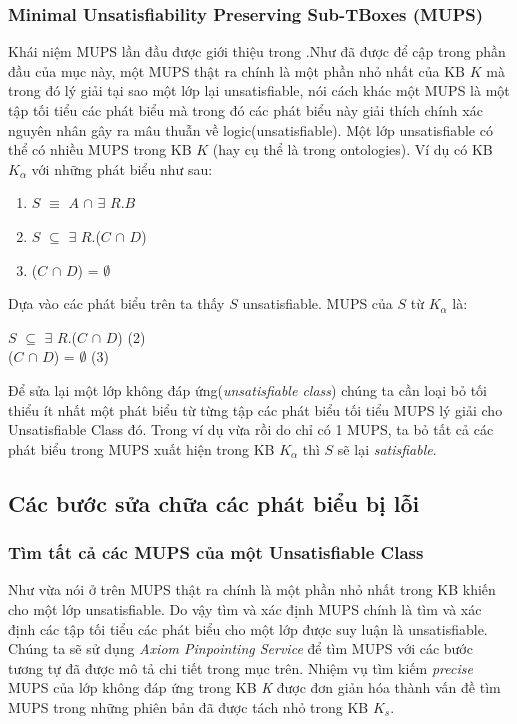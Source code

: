 \subsubsection{Minimal Unsatisfiability Preserving Sub-TBoxes (MUPS)}
Khái niệm MUPS lần đầu được giới thiệu trong \cite{mups}.Như đã được để cập trong phần đầu của mục này, một MUPS thật ra chính là một phần nhỏ nhất của KB $K$ mà trong đó lý giải tại sao một lớp lại unsatisfiable, nói cách khác một MUPS là một tập tối tiểu các phát biểu mà trong đó các phát biểu này giải thích chính xác nguyên nhân gây ra mâu thuẫn về logic(unsatisfiable). Một lớp unsatisfiable có thể có nhiều MUPS trong KB $K$ (hay cụ thể là trong ontologies). Ví dụ có KB $K_{\alpha}$ với những phát biểu như sau:
	\begin{enumerate}
		\item $S$ $\equiv$ $A$ $\cap$ $\exists$ $R.B$
		\item $S$ $\subseteq$ $\exists$ $R$.($C$ $\cap$ $D$) 
		\item ($C$ $\cap$ $D$) = $\emptyset$ 
	\end{enumerate}
	Dựa vào các phát biểu trên ta thấy $S$ unsatisfiable. MUPS của $S$ từ $K_{\alpha}$ là:
	\begin{center}
		$S$ $\subseteq$ $\exists$ $R$.($C$ $\cap$ $D$) (2)
		\\
		($C$ $\cap$ $D$) = $\emptyset$ (3)
	\end{center}
Để sửa lại một lớp không đáp ứng(\textit{unsatisfiable class}) chúng ta cần loại bỏ tối thiểu ít nhất một phát biểu từ từng tập các phát biểu tối tiểu MUPS lý giải cho Unsatisfiable Class đó. Trong ví dụ vừa rồi do chỉ có 1 MUPS, ta bỏ tất cả các phát biểu trong MUPS xuất hiện trong KB $K_{\alpha}$ thì $S$ sẽ lại \textit{satisfiable}.
\subsection{Các bước sửa chữa các phát biểu bị lỗi}
\subsubsection{Tìm tất cả các MUPS của một Unsatisfiable Class}
Như vừa nói ở trên MUPS thật ra chính là một phần nhỏ nhất trong KB khiến cho một lớp unsatisfiable. Do vậy tìm và xác định MUPS chính là tìm và xác định các tập tối tiểu các phát biểu cho một lớp được suy luận là  unsatisfiable. Chúng ta sẽ sử dụng \textit{Axiom Pinpointing Service}\cite{axiomPinpoint} để tìm MUPS với các bước tương tự đã được mô tả chi tiết trong mục trên. Nhiệm vụ tìm kiếm \textit{precise} MUPS của lớp không đáp ứng trong KB \textit{K} được đơn giản hóa thành vấn đề tìm MUPS trong những phiên bản đã được tách nhỏ trong KB $K_{s}$.
